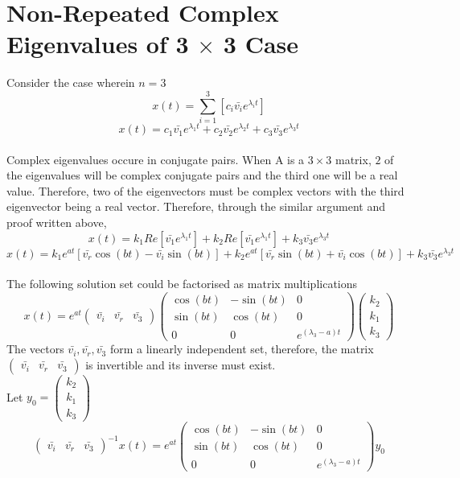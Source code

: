 \section{Non-Repeated Complex Eigenvalues of 3 $\times$ 3 Case}
\begin{comment}
\end{comment}
Consider the case wherein $n = 3$
$$x(t) = \sum_{i=1}^{3}\left[c_i\bar{v_i}e^{\lambda_i t}\right]$$
$$x(t) = c_1\bar{v_1}e^{\lambda_1 t} + c_2\bar{v_2}e^{\lambda_2 t} + c_3\bar{v_3}e^{\lambda_3 t}$$
\\Complex eigenvalues occure in conjugate pairs. When A is a $3 \times 3$ matrix, $2$ of the eigenvalues will be complex conjugate pairs and the third one will be a real value. Therefore, two of the eigenvectors must be complex vectors with the third eigenvector being a real vector. Therefore, through the similar argument and proof written above, 
$$x(t) = k_1Re\left[\bar{v_1}e^{\lambda_1 t}\right] + k_2Re\left[\bar{v_1}e^{\lambda_1 t}\right] + k_3\bar{v_3}e^{\lambda_3 t}$$
$$x(t)=k_1e^{at}[\bar{v_r}\cos{(bt)} - \bar{v_i}\sin{(bt)}] + k_2e^{at}[\bar{v_r}\sin{(bt)} + \bar{v_i}\cos{(bt)}] + k_3\bar{v_3}e^{\lambda_3 t}$$
\\The following solution set could be factorised as matrix multiplications
$$x(t) = e^{at} \begin{pmatrix} \bar{v_i}&\bar{v_r} &\bar{v_3} \end{pmatrix} \begin{pmatrix}\cos{(bt)} &-\sin{(bt)} &0\\\sin{(bt)}&\cos{(bt)} & 0\\0& 0& e^{(\lambda_3 - a)t}\end{pmatrix} \begin{pmatrix} k_2 \\k_1 \\ k_3 \end{pmatrix}$$
The vectors $\bar{v_i},\bar{v_r},\bar{v_3}$ form a linearly independent set, therefore, the matrix $\displaystyle{\begin{pmatrix} \bar{v_i}&\bar{v_r} &\bar{v_3} \end{pmatrix}}$ is invertible and its inverse must exist.
\\Let $\displaystyle{y_0 = \begin{pmatrix} k_2\\k_1 \\k_3 \end{pmatrix}}$ 
$$\begin{pmatrix} \bar{v_i}&\bar{v_r} &\bar{v_3} \end{pmatrix} ^{-1 }x(t) = e^{at} \begin{pmatrix}\cos{(bt)} &-\sin{(bt)} &0\\\sin{(bt)}&\cos{(bt)} & 0\\0& 0& e^{(\lambda_3 - a)t}\end{pmatrix} y_0$$
